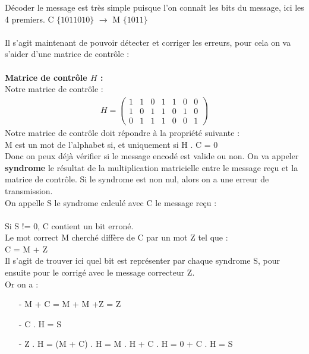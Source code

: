 \documentclass[12pt]{article}
\begin{document}
Décoder le message est très simple puisque l’on connaît les bits du message, ici les 4 premiers. C $\{1011010\}$ $\rightarrow$ M $\{1011\}$\\
\\
Il s’agit maintenant de pouvoir détecter et corriger les erreurs, pour cela on va s’aider d’une matrice de contrôle :
\\
\\ \textbf{Matrice de contrôle $H$ :}
\\
Notre matrice de contrôle :\\
\begin{align*}
  H =
  \left(
  \begin{matrix}
    1 & 1 & 0 & 1 & 1 & 0 & 0 \\
    1 & 0 & 1 & 1 & 0 & 1 & 0 \\
    0 & 1 & 1 & 1 & 0 & 0 & 1
  \end{matrix}
  \right)
\end{align*}
Notre matrice de contrôle doit répondre à la propriété suivante :\\
\tab M est un mot de l’alphabet si, et uniquement si H . C = 0
\\Donc on peux déjà vérifier si le message encodé est valide ou non. On va appeler \textbf{syndrome} le résultat de la multiplication matricielle entre le message reçu et la matrice de contrôle. Si le syndrome est non nul, alors on a une erreur de transmission.
\\
On appelle S le syndrome calculé avec C le message reçu :\\
\\
Si S != 0, C contient un bit erroné. \\
Le mot correct M cherché diffère de C par un mot Z tel que :\\
\tab C = M + Z\\
Il s’agit de trouver ici quel bit est représenter par chaque syndrome S, pour ensuite pour le corrigé avec le message correcteur Z.\\
Or on a :\\
\begin{enumerate}
  \item[-] M  + C = M + M +Z = Z
  \item[-] C . H = S
  \item[-] Z . H = (M + C) . H = M . H + C . H = 0 + C . H = S
\end{enumerate}
\end{document}
